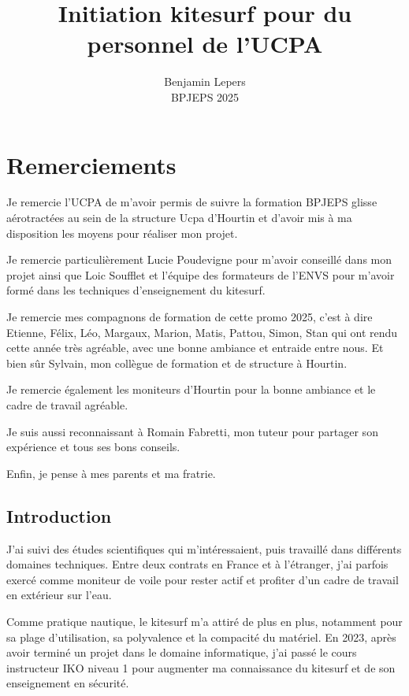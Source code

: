 \documentclass[11pt,a4paper]{report}
\begin{document}
\author{Benjamin Lepers \\ BPJEPS 2025 }
\title{Initiation kitesurf pour du personnel de l'UCPA}
\maketitle
\chapter*{Remerciements}

Je remercie l'UCPA de m'avoir permis de suivre la formation
BPJEPS glisse aérotractées au sein de la structure Ucpa 
d'Hourtin et d'avoir mis à ma disposition les moyens pour
réaliser mon projet.
 
Je remercie particulièrement Lucie Poudevigne pour m'avoir
conseillé  dans mon projet ainsi que Loic Soufflet et l'équipe des
formateurs de l'ENVS pour m'avoir formé dans les techniques
d'enseignement du kitesurf.

Je remercie mes compagnons de formation de cette promo 2025,
c'est à dire Etienne, Félix, Léo, Margaux, Marion, Matis, Pattou,
Simon, Stan qui ont rendu cette année très agréable,
avec une  bonne ambiance et entraide entre nous.
Et bien s\^ur Sylvain, mon collègue de formation et 
de structure à Hourtin.

Je remercie également les moniteurs d'Hourtin  pour la
bonne ambiance et le cadre de travail agréable.

Je suis aussi reconnaissant à  Romain Fabretti, mon tuteur
pour partager son expérience et tous ses bons conseils.

Enfin, je pense à  mes parents et ma fratrie.

\tableofcontents
\newpage
\section{Introduction}
J'ai suivi des études scientifiques qui m'intéressaient, puis
travaillé dans différents domaines techniques. Entre deux contrats en 
France et à l'étranger, j'ai parfois exercé comme moniteur de voile
pour rester actif et profiter d'un cadre de travail en extérieur
sur l'eau.

Comme pratique nautique, le kitesurf m'a attiré de plus en plus, 
notamment pour sa plage d'utilisation, sa polyvalence et la 
compacité du matériel. En 2023, après avoir terminé un projet
dans le domaine informatique, j'ai passé le cours instructeur
IKO\cite{iko} niveau 1 pour augmenter ma connaissance du kitesurf
et de son enseignement en sécurité.
\end{document}
